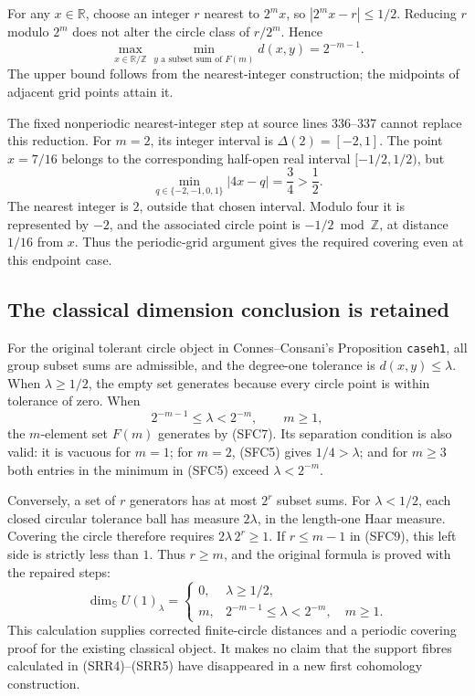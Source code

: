 For any $x\in\mathbb R$, choose an integer $r$ nearest to $2^m x$,
so $|2^m x-r|\le1/2$. Reducing $r$ modulo $2^m$ does not alter the
circle class of $r/2^m$. Hence
\begin{equation}\tag{SFC7}
 \max_{x\in\mathbb R/\mathbb Z}
       \min_{y\text{ a subset sum of }F(m)}d(x,y)=2^{-m-1}.
\end{equation}
The upper bound follows from the nearest-integer construction; the
midpoints of adjacent grid points attain it.

The fixed nonperiodic nearest-integer step at source lines 336--337
cannot replace this reduction. For $m=2$, its integer interval is
$\Delta(2)=[-2,1]$. The point $x=7/16$ belongs to the corresponding
half-open real interval $[-1/2,1/2)$, but
\begin{equation}\tag{SFC8}
 \min_{q\in\{-2,-1,0,1\}}|4x-q|=\frac34>\frac12.
\end{equation}
The nearest integer is $2$, outside that chosen interval. Modulo four
it is represented by $-2$, and the associated circle point is
$-1/2\bmod\mathbb Z$, at distance $1/16$ from $x$. Thus the
periodic-grid argument gives the required covering even at this
endpoint case.

\subsection{The classical dimension conclusion is retained}

For the original tolerant circle object in Connes--Consani's
Proposition \texttt{caseh1}, all group subset sums are admissible,
and the degree-one tolerance is $d(x,y)\le\lambda$.
When $\lambda\ge1/2$, the empty set generates because every circle
point is within tolerance of zero. When
\begin{equation}\tag{SFC9}
 2^{-m-1}\le\lambda<2^{-m},\qquad m\ge1,
\end{equation}
the $m$-element set $F(m)$ generates by (SFC7). Its separation
condition is also valid: it is vacuous for $m=1$; for $m=2$,
(SFC5) gives $1/4>\lambda$; and for $m\ge3$ both entries in the
minimum in (SFC5) exceed $\lambda<2^{-m}$.

Conversely, a set of $r$ generators has at most $2^r$ subset sums.
For $\lambda<1/2$, each closed circular tolerance ball has measure
$2\lambda$, in the length-one Haar measure. Covering the circle
therefore requires $2\lambda\,2^r\ge1$. If $r\le m-1$ in (SFC9),
this left side is strictly less than $1$. Thus $r\ge m$, and the
original formula is proved with the repaired steps:
\begin{equation}\tag{SFC10}
 \dim_{\mathbb S}U(1)_\lambda=
 \begin{cases}
 0,&\lambda\ge1/2,\\
 m,&2^{-m-1}\le\lambda<2^{-m},\quad m\ge1.
 \end{cases}
\end{equation}
This calculation supplies corrected finite-circle distances and a
periodic covering proof for the existing classical object. It makes
no claim that the support fibres calculated in (SRR4)--(SRR5)
have disappeared in a new first cohomology construction.
